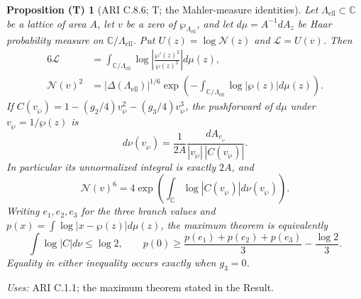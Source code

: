 \documentclass[11pt,a4paper]{article}
\theoremstyle{plain}
\newtheorem{proposition}[theorem]{Proposition (T)}
\theoremstyle{definition}
\newcommand{\C}{\mathbb C}
\begin{document}
\begin{proposition}[ARI C.8.6; T; the Mahler-measure identities]\label{ari:C.8.6}
Let $\Lambda_{\mathrm{ell}}\subset\C$ be a lattice of area $A$, let $v$ be a zero
of $\wp_{\Lambda_{\mathrm{ell}}}$, and let $d\mu=A^{-1}dA_z$ be Haar probability
measure on $\C/\Lambda_{\mathrm{ell}}$. Put $U(z)=\log \mathcal N(z)$ and
$\mathcal L=U(v)$. Then
\begin{align}
 6\mathcal L&=\int_{\C/\Lambda_{\mathrm{ell}}}\log\left|\frac{\wp'(z)^2}{\wp(z)^3}\right|d\mu(z),
 \label{ari:eq:ca-mahler}\\
 \mathcal N(v)^2&=|\Delta(\Lambda_{\mathrm{ell}})|^{1/6}
      \exp\left(-\int_{\C/\Lambda_{\mathrm{ell}}}\log|\wp(z)|d\mu(z)\right).
 \label{ari:eq:ca-wpmean}
\end{align}
If $C(v_{\wp})=1-(g_2/4)v_{\wp}^2-(g_3/4)v_{\wp}^3$, the pushforward of $d\mu$
under $v_{\wp}=1/\wp(z)$ is
\begin{equation}\label{ari:eq:ca-nu}
 d\nu(v_{\wp})=\frac1{2A}\frac{dA_{v_{\wp}}}{|v_{\wp}|\,|C(v_{\wp})|}.
\end{equation}
In particular its unnormalized integral is exactly $2A$, and
\[
 \mathcal N(v)^6=4\exp\left(\int_{\C}\log|C(v_{\wp})|d\nu(v_{\wp})\right).
\]
Writing $e_1,e_2,e_3$ for the three branch values and
$p(x)=\int\log|x-\wp(z)|d\mu(z)$, the maximum theorem is equivalently
\[
 \int\log|C|d\nu\leq\log2,\qquad
 p(0)\geq\frac{p(e_1)+p(e_2)+p(e_3)}3-\frac{\log2}3.
\]
Equality in either inequality occurs exactly when $g_3=0$.
\end{proposition}
\noindent\textit{Uses:} ARI C.1.1; the maximum theorem stated in the Result.\par
\end{document}
